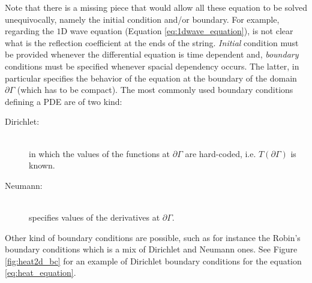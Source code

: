 Note that there is a missing piece that would allow all these equation to be solved unequivocally, namely the initial condition and/or boundary. For example, regarding the $1$D wave equation (Equation \ref{eq:1dwave_equation}), is not clear what is the reflection coefficient at the ends of the string. 
\textit{Initial} condition must be provided whenever the differential equation is time dependent and, \textit{boundary} conditions must be specified whenever spacial dependency occurs. The latter, in particular specifies the behavior of the equation at the boundary of the domain $\partial \Gamma$ (which has to be compact). The most commonly used boundary conditions defining a PDE are of two kind:
\begin{description}
	\item [Dirichlet:] \hfil \\ in which the values of the functions at $\partial \Gamma$ are hard-coded, i.e. $T(\partial \Gamma)$  is known.
	
	\item [Neumann:] \hfil \\ specifies values of the derivatives at $\partial \Gamma$.
	
\end{description} 
Other kind of boundary conditions are possible, such as for instance the Robin's boundary conditions which is a mix of Dirichlet and Neumann ones. See Figure \ref{fig:heat2d_bc} for an example of Dirichlet boundary conditions for the equation \ref{eq:heat_equation}.

